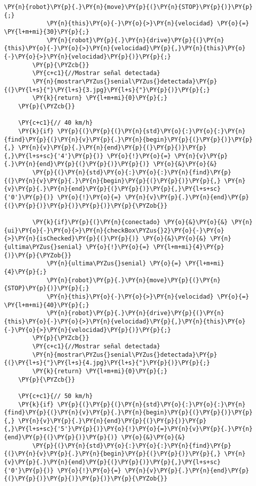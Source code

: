 \begin{Verbatim}[commandchars=\\\{\}]
            \PY{n}{robot}\PY{p}{.}\PY{n}{move}\PY{p}{(}\PY{n}{STOP}\PY{p}{)}\PY{p}{;}
            \PY{n}{this}\PY{o}{-}\PY{o}{>}\PY{n}{velocidad} \PY{o}{=} \PY{l+m+mi}{30}\PY{p}{;}
            \PY{n}{robot}\PY{p}{.}\PY{n}{drive}\PY{p}{(}\PY{n}{this}\PY{o}{-}\PY{o}{>}\PY{n}{velocidad}\PY{p}{,}\PY{n}{this}\PY{o}{-}\PY{o}{>}\PY{n}{velocidad}\PY{p}{)}\PY{p}{;}
        \PY{p}{\PYZcb{}}
        \PY{c+c1}{//Mostrar señal detectada}
        \PY{n}{mostrar\PYZus{}senial\PYZus{}detectada}\PY{p}{(}\PY{l+s}{"}\PY{l+s}{3.jpg}\PY{l+s}{"}\PY{p}{)}\PY{p}{;}
        \PY{k}{return} \PY{l+m+mi}{0}\PY{p}{;}
    \PY{p}{\PYZcb{}}

    \PY{c+c1}{// 40 km/h}
    \PY{k}{if} \PY{p}{(}\PY{p}{(}\PY{n}{std}\PY{o}{:}\PY{o}{:}\PY{n}{find}\PY{p}{(}\PY{n}{v}\PY{p}{.}\PY{n}{begin}\PY{p}{(}\PY{p}{)}\PY{p}{,} \PY{n}{v}\PY{p}{.}\PY{n}{end}\PY{p}{(}\PY{p}{)}\PY{p}{,}\PY{l+s+sc}{'4'}\PY{p}{)} \PY{o}{!}\PY{o}{=} \PY{n}{v}\PY{p}{.}\PY{n}{end}\PY{p}{(}\PY{p}{)}\PY{p}{)} \PY{o}{&}\PY{o}{&}
        \PY{p}{(}\PY{n}{std}\PY{o}{:}\PY{o}{:}\PY{n}{find}\PY{p}{(}\PY{n}{v}\PY{p}{.}\PY{n}{begin}\PY{p}{(}\PY{p}{)}\PY{p}{,} \PY{n}{v}\PY{p}{.}\PY{n}{end}\PY{p}{(}\PY{p}{)}\PY{p}{,}\PY{l+s+sc}{'0'}\PY{p}{)} \PY{o}{!}\PY{o}{=} \PY{n}{v}\PY{p}{.}\PY{n}{end}\PY{p}{(}\PY{p}{)}\PY{p}{)}\PY{p}{)}\PY{p}{\PYZob{}}

        \PY{k}{if}\PY{p}{(}\PY{n}{conectado} \PY{o}{&}\PY{o}{&} \PY{n}{ui}\PY{o}{-}\PY{o}{>}\PY{n}{checkBox\PYZus{}2}\PY{o}{-}\PY{o}{>}\PY{n}{isChecked}\PY{p}{(}\PY{p}{)} \PY{o}{&}\PY{o}{&} \PY{n}{ultima\PYZus{}senial} \PY{o}{!}\PY{o}{=} \PY{l+m+mi}{4}\PY{p}{)}\PY{p}{\PYZob{}}
            \PY{n}{ultima\PYZus{}senial} \PY{o}{=} \PY{l+m+mi}{4}\PY{p}{;}
            \PY{n}{robot}\PY{p}{.}\PY{n}{move}\PY{p}{(}\PY{n}{STOP}\PY{p}{)}\PY{p}{;}
            \PY{n}{this}\PY{o}{-}\PY{o}{>}\PY{n}{velocidad} \PY{o}{=} \PY{l+m+mi}{40}\PY{p}{;}
            \PY{n}{robot}\PY{p}{.}\PY{n}{drive}\PY{p}{(}\PY{n}{this}\PY{o}{-}\PY{o}{>}\PY{n}{velocidad}\PY{p}{,}\PY{n}{this}\PY{o}{-}\PY{o}{>}\PY{n}{velocidad}\PY{p}{)}\PY{p}{;}
        \PY{p}{\PYZcb{}}
        \PY{c+c1}{//Mostrar señal detectada}
        \PY{n}{mostrar\PYZus{}senial\PYZus{}detectada}\PY{p}{(}\PY{l+s}{"}\PY{l+s}{4.jpg}\PY{l+s}{"}\PY{p}{)}\PY{p}{;}
        \PY{k}{return} \PY{l+m+mi}{0}\PY{p}{;}
    \PY{p}{\PYZcb{}}

    \PY{c+c1}{// 50 km/h}
    \PY{k}{if} \PY{p}{(}\PY{p}{(}\PY{n}{std}\PY{o}{:}\PY{o}{:}\PY{n}{find}\PY{p}{(}\PY{n}{v}\PY{p}{.}\PY{n}{begin}\PY{p}{(}\PY{p}{)}\PY{p}{,} \PY{n}{v}\PY{p}{.}\PY{n}{end}\PY{p}{(}\PY{p}{)}\PY{p}{,}\PY{l+s+sc}{'5'}\PY{p}{)}\PY{o}{!}\PY{o}{=}\PY{n}{v}\PY{p}{.}\PY{n}{end}\PY{p}{(}\PY{p}{)}\PY{p}{)} \PY{o}{&}\PY{o}{&}
        \PY{p}{(}\PY{n}{std}\PY{o}{:}\PY{o}{:}\PY{n}{find}\PY{p}{(}\PY{n}{v}\PY{p}{.}\PY{n}{begin}\PY{p}{(}\PY{p}{)}\PY{p}{,} \PY{n}{v}\PY{p}{.}\PY{n}{end}\PY{p}{(}\PY{p}{)}\PY{p}{,}\PY{l+s+sc}{'0'}\PY{p}{)} \PY{o}{!}\PY{o}{=} \PY{n}{v}\PY{p}{.}\PY{n}{end}\PY{p}{(}\PY{p}{)}\PY{p}{)}\PY{p}{)}\PY{p}{\PYZob{}}


\end{Verbatim}
